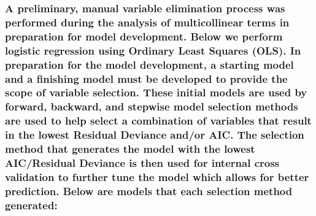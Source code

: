 \documentclass[american,]{article}
\begin{document}
\hypertarget{a-preliminary-manual-variable-elimination-process-was-performed-during-the-analysis-of-multicollinear-terms-in-preparation-for-model-development.-below-we-perform-logistic-regression-using-ordinary-least-squares-ols.-in-preparation-for-the-model-development-a-starting-model-and-a-finishing-model-must-be-developed-to-provide-the-scope-of-variable-selection.-these-initial-models-are-used-by-forward-backward-and-stepwise-model-selection-methods-are-used-to-help-select-a-combination-of-variables-that-result-in-the-lowest-residual-deviance-andor-aic.-the-selection-method-that-generates-the-model-with-the-lowest-aicresidual-deviance-is-then-used-for-internal-cross-validation-to-further-tune-the-model-which-allows-for-better-prediction.-below-are-models-that-each-selection-method-generated}{%
\subsubsection{A preliminary, manual variable elimination process was performed during the analysis of multicollinear terms in preparation for model development. Below we perform logistic regression using Ordinary Least Squares (OLS). In preparation for the model development, a starting model and a finishing model must be developed to provide the scope of variable selection. These initial models are used by forward, backward, and stepwise model selection methods are used to help select a combination of variables that result in the lowest Residual Deviance and/or AIC. The selection method that generates the model with the lowest AIC/Residual Deviance is then used for internal cross validation to further tune the model which allows for better prediction. Below are models that each selection method generated:}\label{a-preliminary-manual-variable-elimination-process-was-performed-during-the-analysis-of-multicollinear-terms-in-preparation-for-model-development.-below-we-perform-logistic-regression-using-ordinary-least-squares-ols.-in-preparation-for-the-model-development-a-starting-model-and-a-finishing-model-must-be-developed-to-provide-the-scope-of-variable-selection.-these-initial-models-are-used-by-forward-backward-and-stepwise-model-selection-methods-are-used-to-help-select-a-combination-of-variables-that-result-in-the-lowest-residual-deviance-andor-aic.-the-selection-method-that-generates-the-model-with-the-lowest-aicresidual-deviance-is-then-used-for-internal-cross-validation-to-further-tune-the-model-which-allows-for-better-prediction.-below-are-models-that-each-selection-method-generated}}
\end{document}
